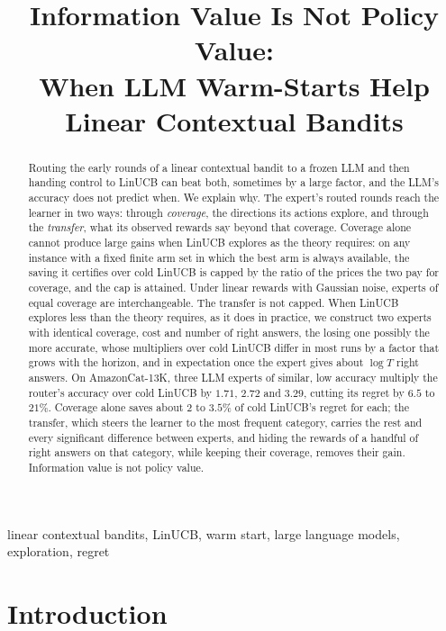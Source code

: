 \documentclass[anon]{alt2027} %
\title[Information Value Is Not Policy Value]{Information Value Is Not Policy Value:\\ When LLM Warm-Starts Help Linear Contextual Bandits}
\begin{document}
\maketitle
\begin{abstract}
Routing the early rounds of a linear contextual bandit to a frozen LLM and
then handing control to LinUCB can beat both, sometimes by a large factor,
and the LLM's accuracy does not predict when. We explain why. The expert's
routed rounds reach the learner in two ways: through \emph{coverage}, the
directions its actions explore, and through the \emph{transfer}, what its
observed rewards say beyond that coverage. Coverage alone cannot produce
large gains when LinUCB explores as the theory requires: on any instance with
a fixed finite arm set in which the best arm is always available, the saving
it certifies over cold LinUCB is capped by the ratio of the prices the two
pay for coverage, and the cap is attained. Under linear rewards with Gaussian
noise, experts of equal coverage are interchangeable. The transfer is not
capped. When LinUCB explores less than the theory requires, as it does in
practice, we construct two experts with identical coverage, cost and number
of right answers, the losing one possibly the more accurate, whose
multipliers over cold LinUCB differ in most runs by a factor that grows with
the horizon, and in expectation once the expert gives about $\log T$ right
answers. On AmazonCat-13K, three LLM experts of similar, low accuracy
multiply the router's accuracy over cold LinUCB by $1.71$, $2.72$ and $3.29$,
cutting its regret by $6.5$ to $21\%$. Coverage alone saves about $2$ to
$3.5\%$ of cold LinUCB's regret for each; the transfer, which steers the
learner to the most frequent category, carries the rest and every
significant difference between experts, and hiding the rewards of a handful
of right answers on that category, while keeping their coverage, removes
their gain. Information value is not policy value.
\end{abstract}

\begin{keywords}%
linear contextual bandits, LinUCB, warm start, large language models, exploration, regret
\end{keywords}


\section{Introduction}
\label{sec:intro}
\end{document}
